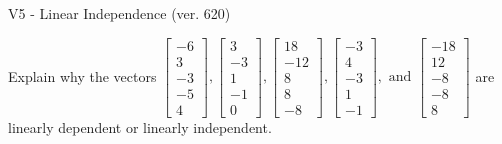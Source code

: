 \begin{exercise}
  \begin{exerciseTitle}V5 - Linear Independence (ver. 620)\end{exerciseTitle}
  \begin{exerciseStatement}
    Explain why the vectors \(\left[\begin{array}{r}
-6 \\
3 \\
-3 \\
-5 \\
4
\end{array}\right] , \left[\begin{array}{r}
3 \\
-3 \\
1 \\
-1 \\
0
\end{array}\right] , \left[\begin{array}{r}
18 \\
-12 \\
8 \\
8 \\
-8
\end{array}\right] , \left[\begin{array}{r}
-3 \\
4 \\
-3 \\
1 \\
-1
\end{array}\right] , \text{ and } \left[\begin{array}{r}
-18 \\
12 \\
-8 \\
-8 \\
8
\end{array}\right]\) are linearly dependent or linearly independent.	



\end{exerciseStatement}
\end{exercise}
